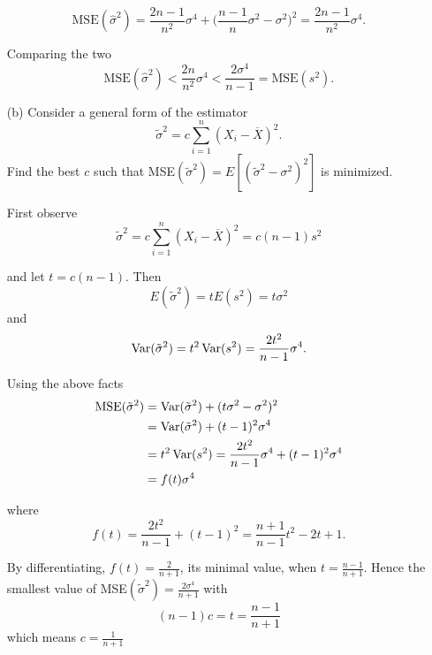 \documentclass{tufte-book}
\begin{document}
\begin{enumerate}
\[ \text{MSE}(\hat{\sigma}^2) =\frac{2n-1}{n^2}\sigma^4 + \Big(\frac{n-1}{n}\sigma^2 - \sigma^2\Big)^2 = \frac{2n-1}{n^2}\sigma^4. \]

Comparing the two
\[ \text{MSE}(\hat{\sigma}^2) < \frac{2n}{n^2}\sigma^4 < \frac{2\sigma^4}{n-1} = \text{MSE}(s^2). \]

\item[(b)]Consider a general form of the estimator
\[ \tilde{\sigma}^2 = c\sum_{i=1}^n(X_i-\overline{X})^2 .\]
Find the best $c$ such that MSE$(\tilde{\sigma}^2)=E[(\tilde{\sigma}^2-\sigma^2)^2]$ is minimized.

First observe
\[  \tilde{\sigma}^2 = c\sum_{i=1}^n(X_i-\overline{X})^2 = c(n-1)s^2 \]

and let $t=c(n-1)$.  Then
\[ E(\tilde{\sigma}^2)= tE(s^2) = t\sigma^2 \]
and
\[\operatorname{Var}(\tilde{\sigma}^2) = t^2\operatorname{Var}(s^2)= \frac{2t^2}{n-1}\sigma^4. \]

Using the above facts
\begin{align*}
\text{MSE}(\tilde{\sigma}^2)&= \operatorname{Var}(\tilde{\sigma}^2) +(t\sigma^2-\sigma^2)^2\\
&= \operatorname{Var}(\tilde{\sigma}^2) + (t-1)^2\sigma^4\\
&= t^2\operatorname{Var}(s^2)= \frac{2t^2}{n-1}\sigma^4 +(t-1)^2\sigma^4\\
&= f(t)\sigma^4
\end{align*}

where
\[ f(t)=\frac{2t^2}{n-1} +(t-1)^2 = \frac{n+1}{n-1}t^2 - 2t+1.\]

By differentiating, $f(t)=\frac{2}{n+1}$, its minimal value, when $t=\frac{n-1}{n+1}$.  Hence the smallest value of MSE$(\tilde{\sigma}^2)=\frac{2\sigma^4}{n+1}$ with
\[(n-1)c=t=\frac{n-1}{n+1} \]
which means $c=\frac{1}{n+1}$
\end{enumerate}
\end{document}
